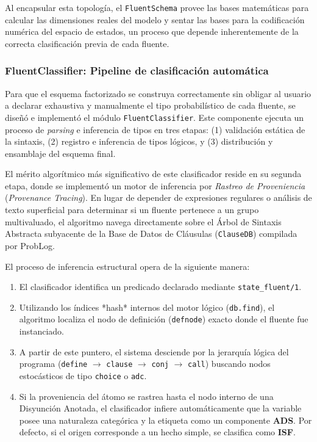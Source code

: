 Al encapsular esta topología, el \texttt{FluentSchema} provee las bases matemáticas para calcular las dimensiones reales del modelo y sentar las bases para la codificación numérica del espacio de estados, un proceso que depende inherentemente de la correcta clasificación previa de cada fluente.

\subsubsection{FluentClassifier: Pipeline de clasificación automática}
\label{sec:di-fluentclassifier}

Para que el esquema factorizado se construya correctamente sin obligar al usuario a declarar exhaustiva y manualmente el tipo probabilístico de cada fluente, se diseñó e implementó el módulo \texttt{FluentClassifier}. Este componente ejecuta un proceso de \textit{parsing} e inferencia de tipos en tres etapas: (1) validación estática de la sintaxis, (2) registro e inferencia de tipos lógicos, y (3) distribución y ensamblaje del esquema final.

El mérito algorítmico más significativo de este clasificador reside en su segunda etapa, donde se implementó un motor de inferencia por \textit{Rastreo de Proveniencia} (\textit{Provenance Tracing}). En lugar de depender de expresiones regulares o análisis de texto superficial para determinar si un fluente pertenece a un grupo multivaluado, el algoritmo navega directamente sobre el Árbol de Sintaxis Abstracta subyacente de la Base de Datos de Cláusulas (\texttt{ClauseDB}) compilada por ProbLog.

El proceso de inferencia estructural opera de la siguiente manera:
\begin{enumerate}
    \item El clasificador identifica un predicado declarado mediante \texttt{state\_fluent/1}.
    \item Utilizando los índices *hash* internos del motor lógico (\texttt{db.find}), el algoritmo localiza el nodo de definición (\texttt{defnode}) exacto donde el fluente fue instanciado.
    \item A partir de este puntero, el sistema desciende por la jerarquía lógica del programa (\texttt{define} $\rightarrow$ \texttt{clause} $\rightarrow$ \texttt{conj} $\rightarrow$ \texttt{call}) buscando nodos estocásticos de tipo \texttt{choice} o \texttt{adc}.
    \item Si la proveniencia del átomo se rastrea hasta el nodo interno de una Disyunción Anotada, el clasificador infiere automáticamente que la variable posee una naturaleza categórica y la etiqueta como un componente \textbf{ADS}. Por defecto, si el origen corresponde a un hecho simple, se clasifica como \textbf{ISF}.
\end{enumerate}

